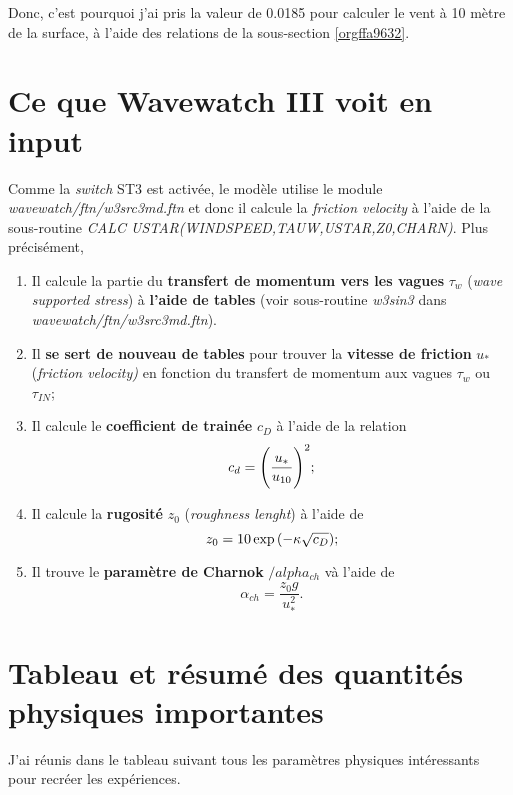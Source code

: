 \documentclass[10pt]{report}
\numberwithin{equation}{section}
\newcommand{\venti}{\vphantom{\sum_x^x}}
\begin{document}
Donc, c'est pourquoi j'ai pris la valeur de 0.0185 pour calculer le vent à 10 mètre de la surface, à l'aide des relations de la sous-section \ref{orgffa9632}.

\section{Ce que Wavewatch III voit en input}
\label{sec:org2917b12}

Comme la \emph{switch} ST3 est activée, le modèle utilise le module \emph{wavewatch/ftn/w3src3md.ftn} et donc il calcule la \emph{friction velocity} à l'aide de la sous-routine \emph{CALC USTAR(WINDSPEED,TAUW,USTAR,Z0,CHARN)}.
Plus précisément,
\begin{enumerate}
\item Il calcule la partie du \textbf{transfert de momentum vers les vagues} \(\tau_w\) (\emph{wave supported stress}) à \textbf{l'aide de tables} (voir sous-routine \emph{w3sin3} dans \emph{wavewatch/ftn/w3src3md.ftn}).
\item Il \textbf{se sert de nouveau de tables} pour trouver la \textbf{vitesse de friction} \(u_*\) (\emph{friction velocity)} en fonction du transfert de momentum aux vagues \(\tau_w\) ou \(\tau_{IN}\);
\item Il calcule le \textbf{coefficient de trainée} \(c_D\) à l'aide de la relation
\begin{equation}
   c_d = \qty(\venti\frac{u_*}{u_{10}})^2;
\end{equation}
\item Il calcule la \textbf{rugosité} \(z_0\) (\emph{roughness lenght}) à l'aide de
\begin{equation}
   z_0 = 10 \exp \qty(-\kappa \sqrt{c_D});
\end{equation}
\item Il trouve le \textbf{paramètre de Charnok} \(/alpha_{ch}\) và l'aide de 
\begin{equation}
   \alpha_{ch} = \frac{z_0 g}{u_*^2}.
\end{equation}
\end{enumerate}



\section{Tableau et résumé des quantités physiques importantes}
\label{sec:orgc91cfae}

J'ai réunis dans le tableau suivant tous les paramètres physiques intéressants pour recréer les expériences.
\end{document}
